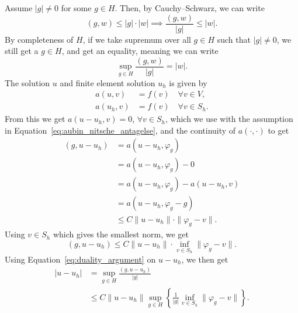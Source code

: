 \begin{bev}
    Assume $|g|\neq 0$ for some $g\in H$. Then,
    by Cauchy–Schwarz, we can write 
    \begin{equation*}
        (g,w) \leq |g| \cdot |w| \implies \frac{(g,w)}{|g|} \leq |w|.
    \end{equation*}
    By completeness of $H$, if we take supremum over all $g\in H$ such that 
    $|g|\neq 0$, we still get a $g\in H$, and get 
    an equality, meaning we can write
    \begin{equation}
        \sup_{g\in H} \frac{(g,w)}{|g|} = |w|. \label{eq:duality_argument}
    \end{equation}
    The solution $u$ and finite element solution $u_h$ is given by 
    \begin{align*}
        a(u,v) &= f(v) \quad \forall v \in V, \\
        a(u_h,v) &= f(v) \quad \forall v \in S_h.
    \end{align*}
    From this we get $a(u-u_h,v)=0$, $\forall v\in S_h$, which we use with the assumption in 
    Equation~\eqref{eq:aubin_nitsche_antagelse}, and the continuity of $a(\cdot,\cdot)$ to get
    \begin{align*}
        (g,u-u_h) &= a(u-u_h,\varphi _g) \\
                  &= a(u-u_h,\varphi _g) -0 \\
                  &=a(u-u_h,\varphi _g) -a(u-u_h,v) \\
                  &=a(u-u_h, \varphi_g -g) \\
                  &\leq C \|u-u_h\| \cdot \|\varphi_g-v\|.
    \end{align*}
    Using $v\in S_h$ which gives the smallest norm, we get 
    \begin{equation*}
        (g,u-u_h) \leq C \|u-u_h\| \cdot \inf_{v\in S_h} \|\varphi_g-v\|.
    \end{equation*}
    Using Equation~\ref{eq:duality_argument} on $u-u_h$, we then get 
    \begin{align*}
        |u-u_h| &= \sup_{g\in H} \frac{(g,u-u_h)}{|g|} \\
        &\leq C \| u-u_h\| \sup_{g\in H} \left \{ \frac{1}{|g|} \inf_{v \in S_h} \|\varphi_g - v\| \right \}.
    \end{align*}
\end{bev}